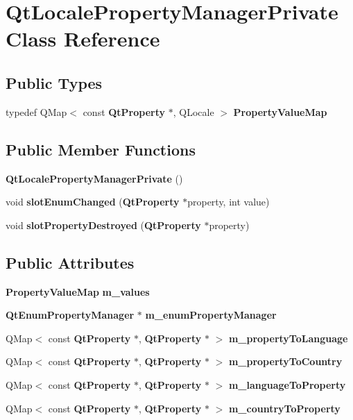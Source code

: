 \section{Qt\+Locale\+Property\+Manager\+Private Class Reference}
\label{classQtLocalePropertyManagerPrivate}
\subsection*{Public Types}
\begin{DoxyCompactItemize}
\item 
typedef Q\+Map$<$ const {\bf Qt\+Property} $\ast$, Q\+Locale $>$ {\bf Property\+Value\+Map}
\end{DoxyCompactItemize}
\subsection*{Public Member Functions}
\begin{DoxyCompactItemize}
\item 
{\bf Qt\+Locale\+Property\+Manager\+Private} ()
\item 
void {\bf slot\+Enum\+Changed} ({\bf Qt\+Property} $\ast$property, int value)
\item 
void {\bf slot\+Property\+Destroyed} ({\bf Qt\+Property} $\ast$property)
\end{DoxyCompactItemize}
\subsection*{Public Attributes}
\begin{DoxyCompactItemize}
\item 
{\bf Property\+Value\+Map} {\bf m\+\_\+values}
\item 
{\bf Qt\+Enum\+Property\+Manager} $\ast$ {\bf m\+\_\+enum\+Property\+Manager}
\item 
Q\+Map$<$ const {\bf Qt\+Property} $\ast$, {\bf Qt\+Property} $\ast$ $>$ {\bf m\+\_\+property\+To\+Language}
\item 
Q\+Map$<$ const {\bf Qt\+Property} $\ast$, {\bf Qt\+Property} $\ast$ $>$ {\bf m\+\_\+property\+To\+Country}
\item 
Q\+Map$<$ const {\bf Qt\+Property} $\ast$, {\bf Qt\+Property} $\ast$ $>$ {\bf m\+\_\+language\+To\+Property}
\item 
Q\+Map$<$ const {\bf Qt\+Property} $\ast$, {\bf Qt\+Property} $\ast$ $>$ {\bf m\+\_\+country\+To\+Property}
\end{DoxyCompactItemize}


